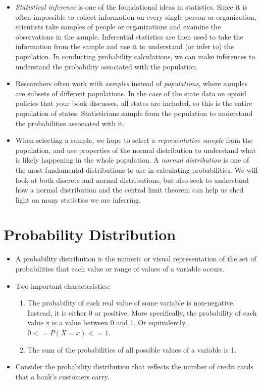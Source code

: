 \documentclass[
  letterpaper,
  DIV=11,
  numbers=noendperiod]{scrreprt}
\providecommand{\tightlist}{%
  \setlength{\itemsep}{0pt}\setlength{\parskip}{0pt}}\usepackage{longtable,booktabs,array}
\begin{document}
\begin{itemize}
\item
  \emph{Statistical inference} is one of the foundational ideas in
  statistics. Since it is often impossible to collect information on
  every single person or organization, scientists take samples of people
  or organizations and examine the observations in the sample.
  Inferential statistics are then used to take the information from the
  sample and use it to understand (or infer to) the population. In
  conducting probability calculations, we can make inferences to
  understand the probability associated with the population.
\item
  Researchers often work with \emph{samples} instead of
  \emph{populations}, where samples are subsets of different
  populations. In the case of the state data on opioid policies that
  your book discusses, all states are included, so this is the entire
  population of states. Statisticians sample from the population to
  understand the probabilities associated with it.
\item
  When selecting a sample, we hope to select a \emph{representative
  sample} from the population, and use properties of the normal
  distribution to understand what is likely happening in the whole
  population. A \emph{normal distribution} is one of the most
  fundamental distributions to use in calculating probabilities. We will
  look at both discrete and normal distributions, but also seek to
  understand how a normal distribution and the central limit theorem can
  help us shed light on many statistics we are inferring.
\end{itemize}

\section{Probability Distribution}\label{probability-distribution}

\begin{itemize}
\item
  A probability distribution is the numeric or visual representation of
  the set of probabilities that each value or range of values of a
  variable occurs.
\item
  Two important characteristics:

  \begin{enumerate}
  \def\labelenumi{\arabic{enumi}.}
  \tightlist
  \item
    The probability of each real value of some variable is non-negative.
    Instead, it is either 0 or positive. More specifically, the
    probability of each value x is a value between 0 and 1. Or
    equivalently. \(0 <= P(X=x) <= 1\).
  \item
    The sum of the probabilities of all possible values of a variable is
    1.
  \end{enumerate}
\item
  Consider the probability distribution that reflects the number of
  credit cards that a bank's customers carry.
\end{itemize}
\end{document}
